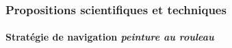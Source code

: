 \documentclass{beamer}
\begin{document}
			\begin{frame}
				\frametitle{Propositions scientifiques et techniques}
				\framesubtitle{Stratégie de navigation \textit{peinture au rouleau}}
				\begin{figure}[H]
					\centering
				\end{figure}
			\end{frame}
\end{document}
